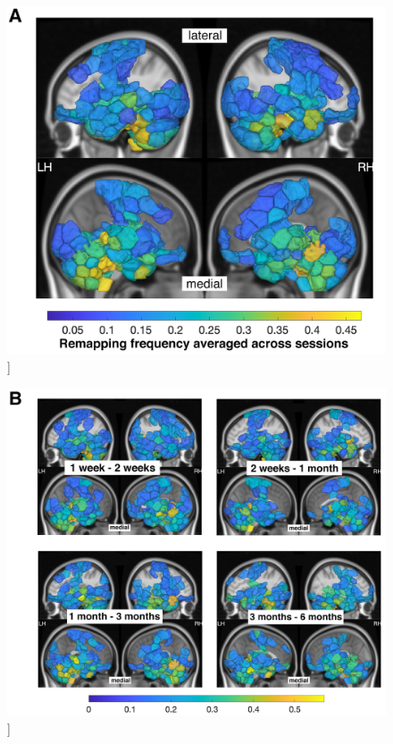 \documentclass[phd,tocprelim]{cornell}
\renewcommand{\caption}[1]{\singlespacing\hangcaption{#1}\normalspacing}
\begin{document}
\null
\vfill
\begin{figure}[h!]
		\ContinuedFloat
		\captionsetup{labelformat=adja-page}
    \centering
    \includegraphics[width=1\textwidth]{chapter1/SupplementaryFigure16A.png}
    \caption[]{}
\end{figure}
\null
\vfill
\clearpage
\null
\vfill
\begin{figure}[h!]
		\ContinuedFloat
		\captionsetup{labelformat=adja-page}
    \centering
    \includegraphics[width=\textwidth]{chapter1/SupplementaryFigure16B.png}
    \caption[]{}
\end{figure}
\null
\vfill
\clearpage
\null
\vfill
\end{document}

